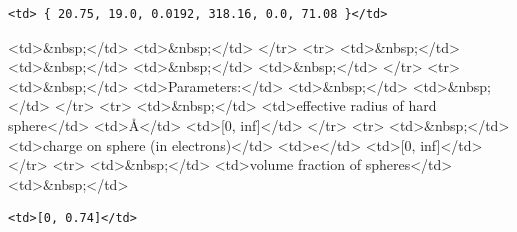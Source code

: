 \begin{verbatim}
<td> { 20.75, 19.0, 0.0192, 318.16, 0.0, 71.08 }</td>
\end{verbatim}

\textless{}td\textgreater{}\&nbsp;\textless{}/td\textgreater{} \textless{}td\textgreater{}\&nbsp;\textless{}/td\textgreater{} \textless{}/tr\textgreater{} \textless{}tr\textgreater{} \textless{}td\textgreater{}\&nbsp;\textless{}/td\textgreater{} \textless{}td\textgreater{}\&nbsp;\textless{}/td\textgreater{} \textless{}td\textgreater{}\&nbsp;\textless{}/td\textgreater{} \textless{}td\textgreater{}\&nbsp;\textless{}/td\textgreater{} \textless{}/tr\textgreater{} \textless{}tr\textgreater{} \textless{}td\textgreater{}\&nbsp;\textless{}/td\textgreater{} \textless{}td\textgreater{}Parameters:\textless{}/td\textgreater{} \textless{}td\textgreater{}\&nbsp;\textless{}/td\textgreater{} \textless{}td\textgreater{}\&nbsp;\textless{}/td\textgreater{} \textless{}/tr\textgreater{} \textless{}tr\textgreater{} \textless{}td\textgreater{}\&nbsp;\textless{}/td\textgreater{} \textless{}td\textgreater{}effective radius of hard sphere\textless{}/td\textgreater{} \textless{}td\textgreater{}\AA{}\textless{}/td\textgreater{} \textless{}td\textgreater{}[0, inf]\textless{}/td\textgreater{} \textless{}/tr\textgreater{} \textless{}tr\textgreater{} \textless{}td\textgreater{}\&nbsp;\textless{}/td\textgreater{} \textless{}td\textgreater{}charge on sphere (in electrons)\textless{}/td\textgreater{} \textless{}td\textgreater{}e\textless{}/td\textgreater{} \textless{}td\textgreater{}[0, inf]\textless{}/td\textgreater{} \textless{}/tr\textgreater{} \textless{}tr\textgreater{} \textless{}td\textgreater{}\&nbsp;\textless{}/td\textgreater{} \textless{}td\textgreater{}volume fraction of spheres\textless{}/td\textgreater{} \textless{}td\textgreater{}\&nbsp;\textless{}/td\textgreater{}

\begin{verbatim}
<td>[0, 0.74]</td>
\end{verbatim}

